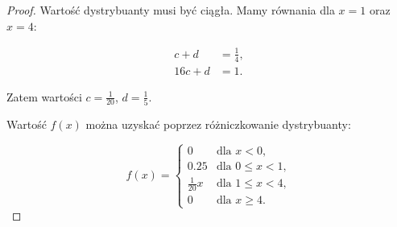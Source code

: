 \documentclass[11pt]{article}
\theoremstyle{definition}
\numberwithin{zadanie}{section}
\begin{document}
\begin{proof}
    Wartość dystrybuanty musi być ciągła. Mamy równania dla $x=1$ oraz $x=4$:

    \begin{align*}
        c+d   & =\frac14, \\
        16c+d & =1.
    \end{align*}

    Zatem wartości $c=\frac1{20}$, $d=\frac{1}{5}$.

    Wartość $f(x)$ można uzyskać poprzez różniczkowanie dystrybuanty:

    \[
        f(x) = \left\{\begin{array}{lr}
            0           & \text{dla } x < 0,       \\
            0.25        & \text{dla } 0\leq x < 1, \\
            \frac1{20}x & \text{dla } 1\leq x < 4, \\
            0           & \text{dla } x\geq 4.
        \end{array}\right.
    \]
\end{proof}
\end{document}
